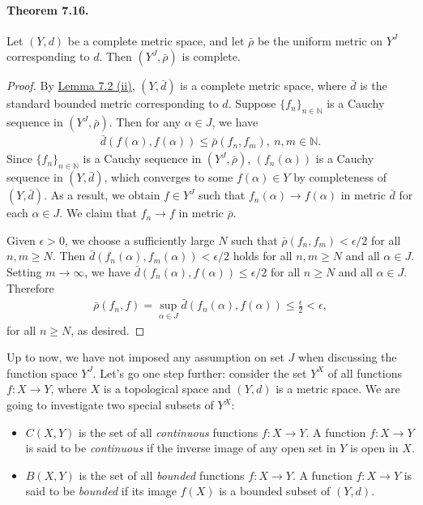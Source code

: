 \documentclass{article}
\numberwithin{equation}{section}
\theoremstyle{plain}
\theoremstyle{definition}
\begin{document}
\paragraph{Theorem 7.16.\label{thm:7.16}} Let $(Y,d)$ be a complete metric space, and let $\bar{\rho}$ be the uniform metric on $Y^J$ corresponding to $d$. Then $(Y^J,\bar{\rho})$ is complete.
\begin{proof}
By \hyperref[lemma:7.2]{Lemma 7.2 (ii)}, $(Y,\bar{d})$ is a complete metric space, where $\bar{d}$ is the standard bounded metric corresponding to $d$. Suppose $\{f_n\}_{n\in\mathbb{N}}$ is a Cauchy sequence in $(Y^J,\bar{\rho})$. Then for any $\alpha\in J$, we have
\begin{align*}
	\bar{d}\left(f(\alpha),f(\alpha)\right)\leq\bar{\rho}\left(f_n,f_m\right),\ n,m\in\mathbb{N}.
\end{align*}
Since $\{f_n\}_{n\in\mathbb{N}}$ is a Cauchy sequence in $(Y^J,\bar{\rho})$, $(f_n(\alpha))$ is a Cauchy sequence in $(Y,\bar{d})$, which converges to some $f(\alpha)\in Y$ by completeness of $(Y,\bar{d})$. As a result, we obtain $f\in Y^J$ such that $f_n(\alpha)\to f(\alpha)$ in metric $\bar{d}$ for each $\alpha\in J$. We claim that $f_n\to f$ in metric $\bar{\rho}$.

Given $\epsilon > 0$, we choose a sufficiently large $N$ such that $\bar{\rho}(f_n,f_m)<\epsilon/2$ for all $n,m\geq N$. Then $\bar{d}\left(f_n(\alpha),f_m(\alpha)\right)<\epsilon/2$ holds for all $n,m \geq N$ and all $\alpha\in J$. Setting $m\to\infty$, we have $\bar{d}\left(f_n(\alpha),f(\alpha)\right)\leq\epsilon/2$ for all $n \geq N$ and all $\alpha\in J$. Therefore
\begin{align*}
	\bar{\rho}\left(f_n,f\right)=\sup_{\alpha\in J}\bar{d}\left(f_n(\alpha),f(\alpha)\right) \leq \frac{\epsilon}{2} < \epsilon,
\end{align*}
for all $n\geq N$, as desired.
\end{proof}

Up to now, we have not imposed any assumption on set $J$ when discussing the function space $Y^J$. Let's go one step further: consider the set $Y^X$ of all functions $f:X\to Y$, where $X$ is a topological space and $(Y,d)$ is a metric space. We are going to investigate two special subsets of $Y^X$:
\begin{itemize}
	\item $C(X,Y)$ is the set of all \textit{continuous} functions $f:X\to Y$. A function $f:X\to Y$ is said to be \textit{continuous} if the inverse image of any open set in $Y$ is open in $X$.
	\item  $B(X,Y)$ is the set of all \textit{bounded} functions $f:X\to Y$. A function $f:X\to Y$ is said to be \textit{bounded} if its image $f(X)$ is a bounded subset of $(Y,d)$.
\end{itemize}
\end{document}
